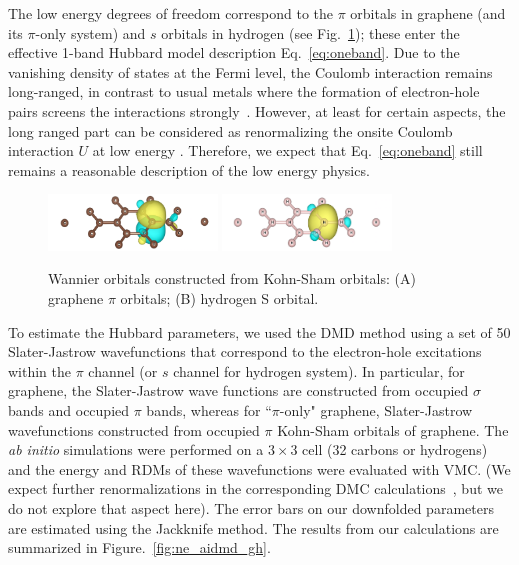 The low energy degrees of freedom correspond to the $\pi$ orbitals in graphene (and its $\pi$-only system) 
and $s$ orbitals in hydrogen (see Fig.~\ref{fig:honeycomb_wan}); these enter the effective 
1-band Hubbard model description Eq.~\eqref{eq:oneband}. Due to the vanishing density of states at 
the Fermi level, the Coulomb interaction remains long-ranged, in contrast to usual 
metals where the formation of electron-hole pairs screens the interactions strongly~\cite{Zheng2016}. 
However, at least for certain aspects, the long ranged part can be considered as renormalizing the 
onsite Coulomb interaction $U$ at low energy \cite{Schuler2013, Changlani2015}. 
Therefore, we expect that Eq.~\eqref{eq:oneband} still remains a reasonable description of the low energy physics. 
\begin{figure}[hbt]
\centering
\includegraphics[width=0.40\textwidth]{./Figures/c_pi.png}
\includegraphics[width=0.40\textwidth]{./Figures/h_wan.png}
\caption{Wannier orbitals constructed from Kohn-Sham orbitals: (A) graphene $\pi$ orbitals; (B) hydrogen S orbital. }
\label{fig:honeycomb_wan}
\end{figure}

To estimate the Hubbard parameters, we used the DMD method using a set of 50 Slater-Jastrow wavefunctions that correspond 
to the electron-hole excitations within the $\pi$ channel (or $s$ channel for hydrogen system). In particular, for graphene, 
the Slater-Jastrow wave functions are constructed from occupied $\sigma$ bands and occupied $\pi$ bands, whereas for ``$\pi$-only" graphene, 
Slater-Jastrow wavefunctions constructed from occupied $\pi$ Kohn-Sham orbitals of graphene. The \textit{ab initio} simulations 
were performed on a $3\times3$ cell (32 carbons or hydrogens) and the energy and RDMs of these wavefunctions were
evaluated with VMC. (We expect further renormalizations in the corresponding DMC calculations~\cite{Changlani2015}, 
but we do not explore that aspect here). The error bars on our downfolded parameters are estimated using the Jackknife method. 
The results from our calculations are summarized in %
Figure.~\ref{fig:ne_aidmd_gh}.%


